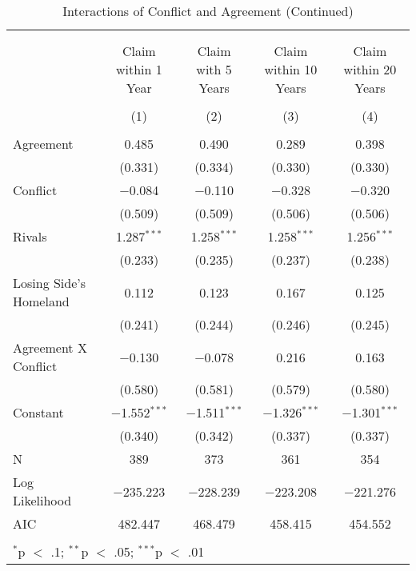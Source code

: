 \documentclass{article}
\begin{document}
\begin{table}[!htbp] \centering 
  \caption{Interactions of Conflict and Agreement (Continued)} 
  \label{} 
\begin{tabular}{@{\extracolsep{5pt}}lcccc} 
\\[-1.8ex]\hline \\[-1.8ex] 
\\[-1.8ex] & Claim within 1 Year & Claim with 5 Years & Claim within 10 Years & Claim within 20 Years \\ 
\\[-1.8ex] & (1) & (2) & (3) & (4)\\ 
\hline \\[-1.8ex] 
 Agreement & 0.485 & 0.490 & 0.289 & 0.398 \\ 
  & (0.331) & (0.334) & (0.330) & (0.330) \\ 
  Conflict & $-$0.084 & $-$0.110 & $-$0.328 & $-$0.320 \\ 
  & (0.509) & (0.509) & (0.506) & (0.506) \\ 
  Rivals & 1.287$^{***}$ & 1.258$^{***}$ & 1.258$^{***}$ & 1.256$^{***}$ \\ 
  & (0.233) & (0.235) & (0.237) & (0.238) \\ 
  Losing Side's Homeland & 0.112 & 0.123 & 0.167 & 0.125 \\ 
  & (0.241) & (0.244) & (0.246) & (0.245) \\ 
  Agreement X Conflict & $-$0.130 & $-$0.078 & 0.216 & 0.163 \\ 
  & (0.580) & (0.581) & (0.579) & (0.580) \\ 
  Constant & $-$1.552$^{***}$ & $-$1.511$^{***}$ & $-$1.326$^{***}$ & $-$1.301$^{***}$ \\ 
  & (0.340) & (0.342) & (0.337) & (0.337) \\ 
 N & 389 & 373 & 361 & 354 \\ 
Log Likelihood & $-$235.223 & $-$228.239 & $-$223.208 & $-$221.276 \\ 
AIC & 482.447 & 468.479 & 458.415 & 454.552 \\ 
\hline \\[-1.8ex] 
\multicolumn{5}{l}{$^{*}$p $<$ .1; $^{**}$p $<$ .05; $^{***}$p $<$ .01} \\ 
\end{tabular} 
\end{table} 
\end{document}
